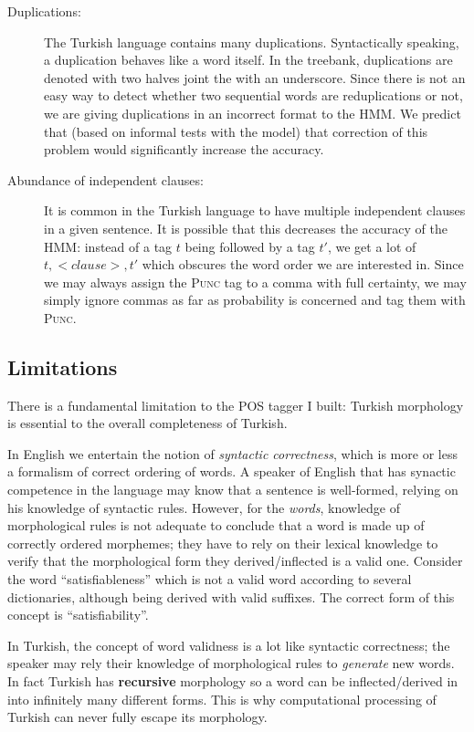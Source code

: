 \documentclass{article}
\begin{document}
\begin{description}

  \item[Duplications:] The Turkish language contains many duplications.
  Syntactically speaking, a duplication behaves like a word itself. In the
  treebank, duplications are denoted with two halves joint the with an
  underscore. Since there is not an easy way to detect whether two sequential
  words are reduplications or not, we are giving duplications in an incorrect
  format to the HMM.  We predict that (based on informal tests with the model)
  that correction of this problem would significantly increase the accuracy.

  \item[Abundance of independent clauses:] It is common in the Turkish language
  to have multiple independent clauses in a given sentence. It is possible that
  this decreases the accuracy of the HMM: instead of a tag $t$ being followed by
  a tag $t'$, we get a lot of $t, <clause>, t'$ which obscures the word order we
  are interested in. Since we may always assign the \textsc{Punc} tag to a comma
  with full certainty, we may simply ignore commas as far as probability is
  concerned and tag them with \textsc{Punc}.

\end{description}

\subsection{Limitations}
There is a fundamental limitation to the POS tagger I built: Turkish morphology
is essential to the overall completeness of Turkish.

In English we entertain the notion of \emph{syntactic correctness}, which is
more or less a formalism of correct ordering of words. A speaker of English that
has synactic competence in the language \citep{bachman1990} may know that a
sentence is well-formed, relying on his knowledge of syntactic rules. However,
for the \textit{words}, knowledge of morphological rules is not adequate to
conclude that a word is made up of correctly ordered morphemes; they have to
rely on their lexical knowledge to verify that the morphological form they
derived/inflected is a valid one. Consider the word ``satisfiableness'' which is
not a valid word according to several dictionaries, although being derived with
valid suffixes. The correct form of this concept is ``satisfiability''.

In Turkish, the concept of word validness is a lot like syntactic correctness;
the speaker may rely their knowledge of morphological rules to \emph{generate}
new words. In fact Turkish has \textbf{recursive} morphology \citep{kabak2001}
so a word can be inflected/derived in into infinitely many different forms. This
is why computational processing of Turkish can never fully escape its
morphology.
\end{document}
